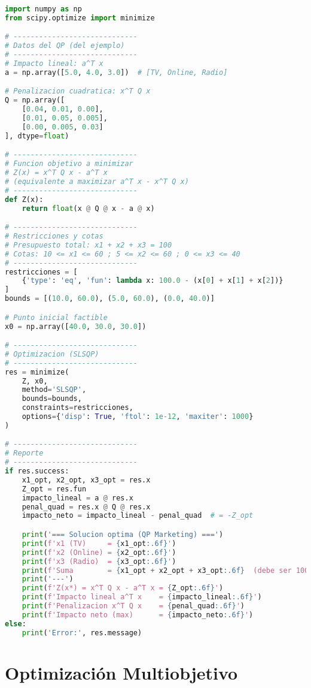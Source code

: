 \documentclass[12pt]{article}
\begin{document}
\begin{lstlisting}[language=Python]
import numpy as np
from scipy.optimize import minimize

# -----------------------------
# Datos del QP (del ejemplo)
# -----------------------------
# Impacto lineal: a^T x
a = np.array([5.0, 4.0, 3.0])  # [TV, Online, Radio]

# Penalizacion cuadratica: x^T Q x
Q = np.array([
    [0.04, 0.01, 0.00],
    [0.01, 0.05, 0.005],
    [0.00, 0.005, 0.03]
], dtype=float)

# -----------------------------
# Funcion objetivo a minimizar
# Z(x) = x^T Q x - a^T x
# (equivalente a maximizar a^T x - x^T Q x)
# -----------------------------
def Z(x):
    return float(x @ Q @ x - a @ x)

# -----------------------------
# Restricciones y cotas
# Presupuesto total: x1 + x2 + x3 = 100
# Cotas: 10 <= x1 <= 60 ; 5 <= x2 <= 60 ; 0 <= x3 <= 40
# -----------------------------
restricciones = [
    {'type': 'eq', 'fun': lambda x: 100.0 - (x[0] + x[1] + x[2])}
]
bounds = [(10.0, 60.0), (5.0, 60.0), (0.0, 40.0)]

# Punto inicial factible
x0 = np.array([40.0, 30.0, 30.0])

# -----------------------------
# Optimizacion (SLSQP)
# -----------------------------
res = minimize(
    Z, x0,
    method='SLSQP',
    bounds=bounds,
    constraints=restricciones,
    options={'disp': True, 'ftol': 1e-12, 'maxiter': 1000}
)

# -----------------------------
# Reporte
# -----------------------------
if res.success:
    x1_opt, x2_opt, x3_opt = res.x
    Z_opt = res.fun
    impacto_lineal = a @ res.x
    penal_quad = res.x @ Q @ res.x
    impacto_neto = impacto_lineal - penal_quad  # = -Z_opt

    print('=== Solucion optima (QP Marketing) ===')
    print(f'x1 (TV)     = {x1_opt:.6f}')
    print(f'x2 (Online) = {x2_opt:.6f}')
    print(f'x3 (Radio)  = {x3_opt:.6f}')
    print(f'Suma        = {x1_opt + x2_opt + x3_opt:.6f}  (debe ser 100)')
    print('---')
    print(f'Z(x*) = x^T Q x - a^T x = {Z_opt:.6f}')
    print(f'Impacto lineal a^T x    = {impacto_lineal:.6f}')
    print(f'Penalizacion x^T Q x    = {penal_quad:.6f}')
    print(f'Impacto neto (max)      = {impacto_neto:.6f}')
else:
    print('Error:', res.message)
\end{lstlisting}


\section{Optimización Multiobjetivo}
\end{document}
